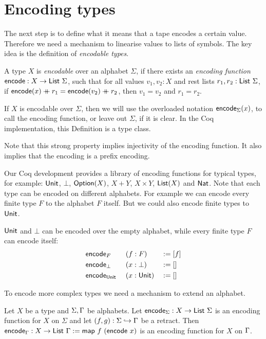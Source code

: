 \documentclass{psartcl}
\begin{document}
\section{Encoding types}
\label{sec:encode}

The next step is to define what it means that a tape encodes a certain value.
Therefore we need a mechanism to linearise values to lists of symbols.
The key idea is the definition of \emph{encodable types}.

\begin{definition}
  \label{def:code}
  A type $X$ is \emph{encodable} over an alphabet $\Sigma$, if there exists an \emph{encoding function}
  $\textsf{encode} : X \rightarrow \textsf{List}~\Sigma$, such that for all values $v_1, v_2:X$ and rest lists $r_1, r_2:\textsf{List}~\Sigma$,
  if $\textsf{encode}(x) \mathbin{+\mkern-10mu+} r_1 = \textsf{encode}(v_2) \mathbin{+\mkern-10mu+} r_2$, then
  $v_1 = v_2$ and $r_1 = r_2$.

  If $X$ is encodable over $\Sigma$, then we will use the overloaded notation $\textsf{encode}_{\Sigma}(x)$, to call the encoding function, or leave out
  $\Sigma$, if it is clear.  In the Coq implementation, this Definition is a type class.
\end{definition}

Note that this strong property implies injectivity of the encoding function.
It also implies that the encoding is a prefix encoding.

Our Coq development provides a library of encoding functions for typical types, for example:  $\textsf{Unit}$, $\bot$, $\textsf{Option}(X)$, $X+Y$, $X \times Y$,
$\textsf{List}(X)$ and $\textsf{Nat}$.  Note that each type can be encoded on different alphabets.  For example we can encode every finite type $F$ to the alphabet
$F$ itself.  But we could also encode finite types to $\textsf{Unit}$.

\begin{example}
  \label{ex:bacic-code}
  $\textsf{Unit}$ and $\bot$ can be encoded over the empty alphabet, while every finite type $F$ can encode itself:
  \begin{alignat*}{3}
    \textsf{encode}&_F    &&~(f:F)     &&:= [f] \\
    \textsf{encode}&_\bot &&~(x:\bot)  &&:= [] \\
    \textsf{encode}&_{\textsf{Unit}}&&~(x:\textsf{Unit}) &&:= [] \\
  \end{alignat*}
\end{example}

To encode more complex types we need a mechanism to extend an alphabet.
\begin{lemma}
  \label{lem:code-map}
  Let $X$ be a type and $\Sigma, \Gamma$ be alphabets.
  Let $\textsf{encode}_\Sigma : X \rightarrow \textsf{List}~\Sigma$ is an encoding function for $X$ on $\Sigma$ and
  let $(f,g) : \Sigma \hookrightarrow \Gamma$ be a retract.
  Then $\textsf{encode}_\Gamma : X \rightarrow \textsf{List}~\Gamma := \textsf{map}~f~(\textsf{encode}~x)$ is an encoding function for $X$ on $\Gamma$.
\end{lemma}
\end{document}
